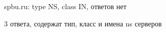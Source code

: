 \documentclass[a4paper,11pt]{article}
\begin{document}
\begin{center}
\label{fig:image}
\end{center}
spbu.ru: type NS, class IN, ответов нет

\begin{center}
\label{fig:image}
\end{center}
3 ответа, содержат тип, класс и имена ns серверов 
\end{document}
